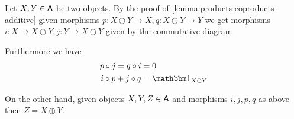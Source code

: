 \documentclass[../../../main]{subfiles}
\begin{document}
\begin{remark}\label{rem:morphisms-in-direct-sum}
  Let \(X, Y \in \mathsf{A}\) be two objects.
  By the proof of \autoref{lemma:products-coproducts-additive} given morphisms \(p: X \oplus Y \to X, q: X \oplus Y \to Y\) we get morphisms \(i: X \to X \oplus Y, j: Y \to X \oplus Y\) given by the commutative diagram
  \begin{center}
  \end{center}
  Furthermore we have
  \begin{align*}
    p \circ j = q \circ i &= 0 \\
    i \circ p + j \circ q &= \id_{X \oplus Y}
  \end{align*}

  On the other hand, given objects \(X, Y, Z \in \mathsf{A}\) and morphisms \(i, j, p, q\) as above then \(Z = X \oplus Y\).
\end{remark}
\end{document}
